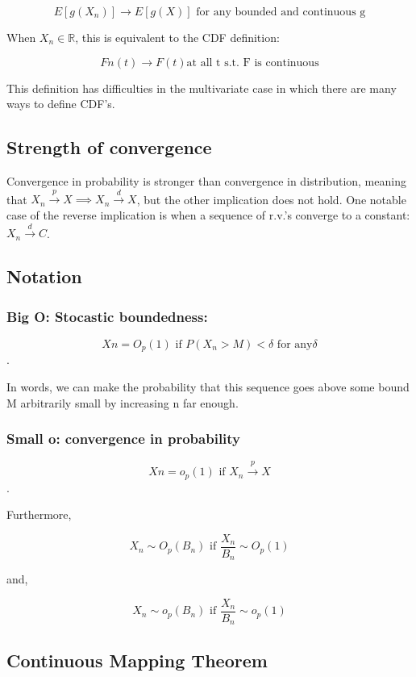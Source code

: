 \documentclass[aos,preprint]{imsart}
\numberwithin{equation}{section}
\theoremstyle{plain}
\begin{document}
$$ E[g(X_n)] \rightarrow E[g(X)] \text{ for any bounded and continuous g} $$

When $ X_n \in \mathbb{R} $, this is equivalent to the CDF definition: 

$$ Fn(t) \rightarrow F(t) \text{at all t s.t. F is continuous}$$ 

This definition has difficulties in the multivariate case in which there are many ways to define CDF's. 

\subsection{Strength of convergence}

Convergence in probability is stronger than convergence in distribution, meaning that ${{X_n}} \xrightarrow{p} X  \implies {{X_n}} \xrightarrow{d} X $, but the other implication does not hold. One  notable case of the reverse implication is when a sequence of r.v.'s converge to a constant:  $ {{X_n}} \xrightarrow{d} C $. 

\subsection{Notation}

\subsubsection{Big O: Stocastic boundedness: }


$$ Xn = O_p(1) \text{ if } P(X_n >M) < \delta \text{ for any} \delta $$. 

In words, we can make the probability that this sequence goes above some bound M arbitrarily small by increasing n far enough. 

\subsubsection{Small o: convergence in probability}

$$ Xn = o_p(1) \text{ if } {{X_n}} \xrightarrow{p} X $$. 

Furthermore, 

$$ X_n \sim O_p(B_n) \text{  if  } \frac{X_n}{B_n} \sim O_p(1) $$

and, 

$$ X_n \sim o_p(B_n) \text{  if  } \frac{X_n}{B_n} \sim o_p(1) $$

\subsection{Continuous Mapping Theorem}
\end{document}
